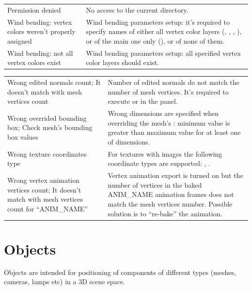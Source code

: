 \documentclass[a4paper,12pt,oneside]{sphinxmanual}
\begin{document}
\begin{tabulary}{\linewidth}{|L|L|}
Permission denied
 & 
No access to the current directory.
\\

Wind bending: vertex colors weren't
properly assigned
 & 
Wind bending parameters setup: it's required to specify names of either all vertex color layers (, , , ), or of the main one only (), or of none of them.
\\

Wind bending: not all
vertex colors exist
 & 
Wind bending parameters setup: all specified vertex color layers should exist.
\\
\hline\end{tabulary}


\begin{tabulary}{\linewidth}{|L|L|}
\hline

Wrong edited normals count; It
doesn't match with mesh vertices
count
 & 
Number of edited normals do not match the number of mesh vertices. It's required to execute  or  in the  panel.
\\

Wrong overrided bounding box; Check
mesh's bounding box values
 & 
Wrong dimensions are specified when overriding the mesh's : minimum value is greater than maximum value for at least one of dimensions.
\\

Wrong texture coordinates type
 & 
For textures with images the following coordinate types are supported: , .
\\

Wrong vertex animation vertices
count; It doesn't match with mesh
vertices count for ``ANIM\_NAME''
 & 
Vertex animation export is turned on but the number of vertices in the baked ANIM\_NAME animation frames does not match the mesh vertices number. Possible solution is to ``re-bake'' the animation.
\\
\hline\end{tabulary}



\chapter{Objects}
\label{objects:objects}\label{objects::doc}\label{objects:id1}
Objects are intended for positioning of components of different types (meshes, cameras, lamps etc) in a 3D scene space.
\end{document}
